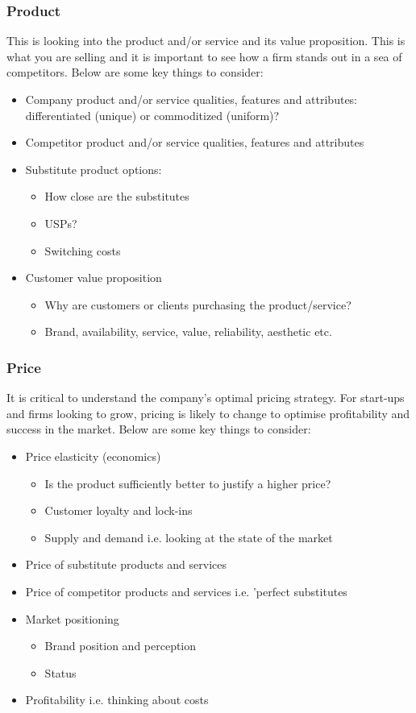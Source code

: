 \documentclass[a4paper]{article}
\begin{document}
{\subsubsection{Product}
This is looking into the product and/or service and its value proposition. This is what you are selling and it is important to see how a firm stands out in a sea of competitors. Below are some key things to consider:

\begin{itemize}
	\item Company product and/or service qualities, features and attributes: differentiated (unique) or commoditized (uniform)?
	\item Competitor product and/or service qualities, features and attributes
	\item Substitute product options:
		\begin{itemize}
			\item How close are the substitutes
			\item USPs?
			\item Switching costs
		\end{itemize}
	\item Customer value proposition
		\begin{itemize}
			\item Why are customers or clients purchasing the product/service?
			\item Brand, availability, service, value, reliability, aesthetic etc.
		\end{itemize}
\end{itemize}

\subsubsection{Price}
It is critical to understand the company's optimal pricing strategy. For start-ups and firms looking to grow, pricing is likely to change to optimise profitability and success in the market. Below are some key things to consider:

\begin{itemize}
	\item Price elasticity (economics)
		\begin{itemize}
			\item Is the product sufficiently better to justify a higher price?
			\item Customer loyalty and lock-ins
			\item Supply and demand i.e. looking at the state of the market
		\end{itemize}
	\item Price of substitute products and services
	\item Price of competitor products and services i.e. 'perfect substitutes
	\item Market positioning
		\begin{itemize}
			\item Brand position and perception
			\item Status
		\end{itemize}
	\item Profitability i.e. thinking about costs
\end{itemize}

}
\end{document}
